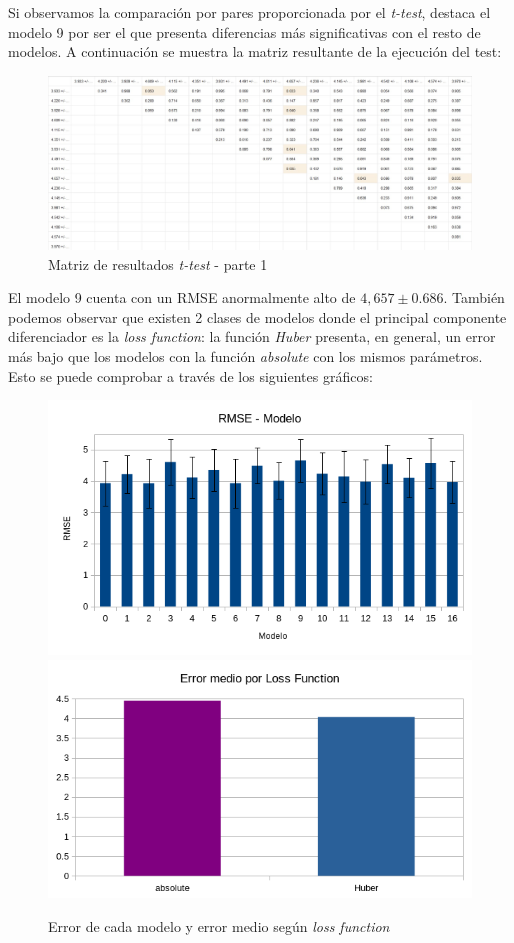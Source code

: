 \documentclass[12pt]{report} %
\begin{document}
    Si observamos la comparación por pares proporcionada por el \textit{t-test}, destaca el modelo 9 por ser el que presenta diferencias más significativas con el resto de modelos. A continuación se muestra la matriz resultante de la ejecución del test:

\begin{figure}[H]
    \includegraphics[width=\linewidth]{t-test.jpeg}
    \caption {\small Matriz de resultados \textit{t-test} - parte 1}
\end{figure}

    El modelo 9 cuenta con un RMSE anormalmente alto de $4,657\pm 0.686$. También podemos observar que existen 2 clases de modelos donde el principal componente diferenciador es la \textit{loss function}: la función \textit{Huber} presenta, en general, un error más bajo que los modelos con la función \textit{absolute} con los mismos parámetros. Esto se puede comprobar a través de los siguientes gráficos:

\begin{figure}[H]
    \includegraphics[width=0.45\linewidth]{RMSE-models.png}
    \includegraphics[width=0.45\linewidth]{error-lossfunction.png}
    \caption{\small Error de cada modelo y error medio según \textit{loss function}}
\end{figure}
\end{document}
